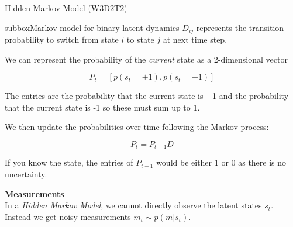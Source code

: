 \begin{textbox}{\href{http://instructor.compneuro.neuromatch.io/tutorials/W3D2_HiddenDynamics/instructor/W3D2_Tutorial2.html}{Hidden Markov Model (W3D2T2)}   }
\begin{subbox}{subbox}{Markov model for binary latent dynamics}
$D_{ij}$ represents the transition probability to switch from state $i$ to state $j$ at next time step. 

We can represent the probability of the \textit{current} state as a 2-dimensional vector 

\begin{equation*}
P_t = [p(s_t = +1), p(s_t = -1)]
\end{equation*}

The entries are the probability that the current state is +1 and the probability that the current state is -1 so these must sum up to 1.

We then update the probabilities over time following the Markov process:

\begin{equation*}
P_{t}= P_{t-1}D 
\end{equation*}

If you know the state, the entries of $P_{t-1}$ would be either 1 or 0 as there is no uncertainty.

\textbf{Measurements}\\
In a \textit{Hidden Markov Model}, we cannot directly observe the latent states $s_t$. Instead we get noisy measurements $m_t\sim p(m|s_t)$.

\end{subbox}

\end{textbox}
